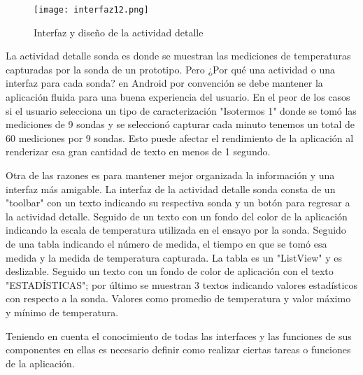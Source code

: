 \begin{figure}[H]
	\centering
	\texttt{[image: interfaz12.png]}
	\caption{Interfaz y diseño de la actividad detalle}
\end{figure}

\par \noindent
La actividad detalle sonda es donde se muestran las mediciones de temperaturas capturadas por la sonda de un prototipo. Pero ¿Por qué una actividad o una interfaz para cada sonda? en Android por convención se debe mantener la aplicación fluida para una buena experiencia del usuario. En el peor de los casos si el usuario selecciona un tipo de caracterización "Isotermos 1" donde se tomó las mediciones de 9 sondas y se seleccionó capturar cada minuto tenemos un total de 60 mediciones por 9 sondas. Esto puede afectar el rendimiento de la aplicación al renderizar esa gran cantidad de texto en menos de 1 segundo.

\par \noindent
Otra de las razones es para mantener mejor organizada la información y una interfaz más amigable. La interfaz de la actividad detalle sonda consta de un "toolbar" con un texto indicando su respectiva sonda y un botón para regresar a la actividad detalle. Seguido de un texto con un fondo del color de la aplicación indicando la escala de temperatura utilizada en el ensayo por la sonda. Seguido de una tabla indicando el número de medida, el tiempo en que se tomó esa medida y la medida de temperatura capturada. La tabla es un "ListView" y es deslizable. Seguido un texto con un fondo de color de aplicación con el texto "ESTADÍSTICAS"; por último se muestran 3 textos indicando valores estadísticos con respecto a la sonda. Valores como promedio de temperatura y valor máximo y mínimo de temperatura.

\par \noindent
Teniendo en cuenta el conocimiento de todas las interfaces y las funciones de sus componentes en ellas es necesario definir como realizar ciertas tareas o funciones de la aplicación.

